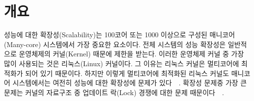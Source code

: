 \section{개요} \label{sec:intro}

성능에 대한 확장성(Scalability)는 100코어 또는 1000 이상으로 구성된 
매니코어(Many-core) 시스템에서 가장 중요한 요소이다. 
전체 시스템의 성능 확장성은 일반적으로 운영체제의 커널(Kernel) 때문에 제한을 받는다.
이러한 운영체제 커널 중 가장 많이 사용되는 것은 리눅스(Linux) 커널이다. 
그 이유는 리눅스 커널은 멀티코어에 최적화가 되어 있기 때문이다.
하지만 이렇게 멀티코어에 최적화된 리눅스 커널도 매니코어 시스템에서는 여전히 
성능에 대한 확장성에 문제가
있다~\cite{SilasBoydWickizer2010LinuxScales48}~\cite{Changwoo2016UMSF}.
확장성 문제중 가장 큰 문제는 커널의 자료구조 중 업데이트 락(Lock) 경쟁에 대한
문제 때문이다~\cite{mckenney2011parallel}~\cite{Matveev2015RLU}.



